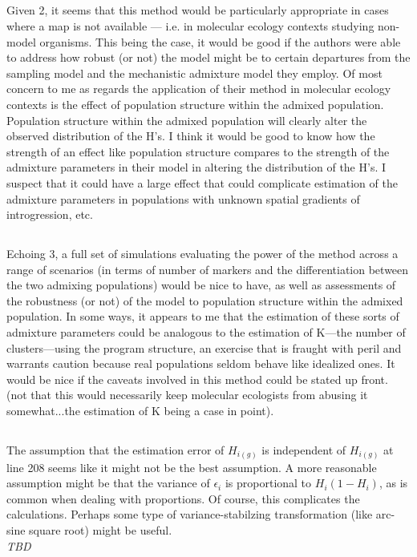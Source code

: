 \documentclass[11pt]{amsart}
\begin{document}
\subsection{} Given 2, it seems that this method would be particularly appropriate in cases where a map is not
available --- i.e. in molecular ecology contexts studying non-model organisms. This being the case, it
would be good if the authors were able to address how robust (or not) the model might be to certain
departures from the sampling model and the mechanistic admixture model they employ. Of most concern
to me as regards the application of their method in molecular ecology contexts is the effect of population
structure within the admixed population. Population structure within the admixed population will clearly
alter the observed distribution of the H's. I think it would be good to know how the strength of an effect
like population structure compares to the strength of the admixture parameters in their model in altering
the distribution of the H's. I suspect that it could have a large effect that could complicate estimation of
the admixture parameters in populations with unknown spatial gradients of introgression, etc.

\subsection{} Echoing 3, a full set of simulations evaluating the power of the method across a range of scenarios (in
terms of number of markers and the differentiation between the two admixing populations) would be nice to
have, as well as assessments of the robustness (or not) of the model to population structure within the
admixed population. In some ways, it appears to me that the estimation of these sorts of admixture
parameters could be analogous to the estimation of K---the number of clusters---using the program
structure, an exercise that is fraught with peril and warrants caution because real populations seldom
behave like idealized ones. It would be nice if the caveats involved in this method could be stated up front.
(not that this would necessarily keep molecular ecologists from abusing it somewhat...the estimation of K
being a case in point).

\subsection{} The assumption that the estimation error of $H_{i(g)}$ is independent of $H_{i(g)}$ at line 208 seems like it
might not be the best assumption. A more reasonable assumption might be that the variance of $\epsilon_i$
is proportional to $H_i(1-H_i)$, as is common when dealing with proportions. Of course, this complicates the
calculations. Perhaps some type of variance-stabilzing transformation (like arc-sine square root) might be
useful.\\
\textit{TBD}
\end{document}
